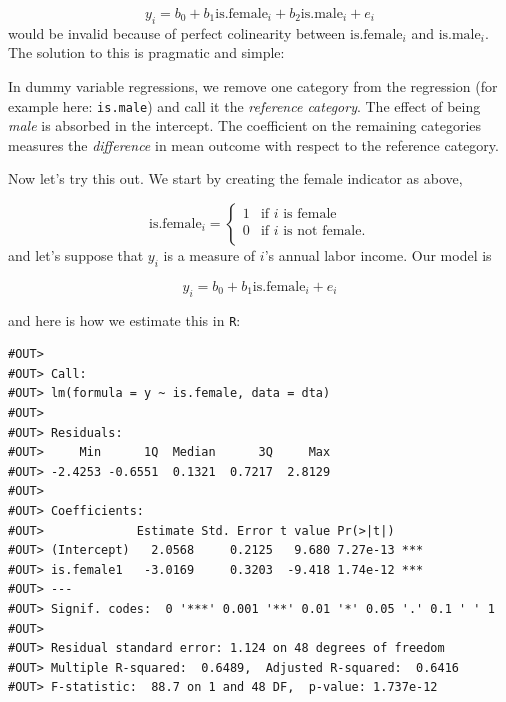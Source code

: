 \documentclass[]{book}
\newenvironment{Shaded}{\begin{snugshade}}{\end{snugshade}}
\newcommand{\CommentTok}[1]{\textcolor[rgb]{0.56,0.35,0.01}{\textit{#1}}}
\newcommand{\KeywordTok}[1]{\textcolor[rgb]{0.13,0.29,0.53}{\textbf{#1}}}
\newcommand{\NormalTok}[1]{#1}
\newcommand{\OperatorTok}[1]{\textcolor[rgb]{0.81,0.36,0.00}{\textbf{#1}}}
\newcommand{\StringTok}[1]{\textcolor[rgb]{0.31,0.60,0.02}{#1}}
\newenvironment{tip}{\begin{tcolorbox}[colback=green!5!white,colframe=green]}{\end{tcolorbox}}
\begin{document}
\[
y_i = b_0 + b_1 \text{is.female}_i + b_2 \text{is.male}_i + e_i
\]
would be invalid because of perfect colinearity between \(\text{is.female}_i\) and \(\text{is.male}_i\). The solution to this is pragmatic and simple:

\begin{tip}
In dummy variable regressions, we remove one category from the
regression (for example here: \texttt{is.male}) and call it the
\emph{reference category}. The effect of being \emph{male} is absorbed
in the intercept. The coefficient on the remaining categories measures
the \emph{difference} in mean outcome with respect to the reference
category.
\end{tip}

Now let's try this out. We start by creating the female indicator as above,

\[
\text{is.female}_i = \begin{cases}
          1 & \text{if }i\text{ is female} \\
            0 & \text{if }i\text{ is not female}. \\
   \end{cases}
\]
and let's suppose that \(y_i\) is a measure of \(i\)'s annual labor income. Our model is

\begin{equation}
y_i = b_0 + b_1 \text{is.female}_i + e_i \label{eq:dummy-reg}
\end{equation}

and here is how we estimate this in \texttt{R}:

\begin{Shaded}
\end{Shaded}

\begin{verbatim}
#OUT> 
#OUT> Call:
#OUT> lm(formula = y ~ is.female, data = dta)
#OUT> 
#OUT> Residuals:
#OUT>     Min      1Q  Median      3Q     Max 
#OUT> -2.4253 -0.6551  0.1321  0.7217  2.8129 
#OUT> 
#OUT> Coefficients:
#OUT>             Estimate Std. Error t value Pr(>|t|)    
#OUT> (Intercept)   2.0568     0.2125   9.680 7.27e-13 ***
#OUT> is.female1   -3.0169     0.3203  -9.418 1.74e-12 ***
#OUT> ---
#OUT> Signif. codes:  0 '***' 0.001 '**' 0.01 '*' 0.05 '.' 0.1 ' ' 1
#OUT> 
#OUT> Residual standard error: 1.124 on 48 degrees of freedom
#OUT> Multiple R-squared:  0.6489,	Adjusted R-squared:  0.6416 
#OUT> F-statistic:  88.7 on 1 and 48 DF,  p-value: 1.737e-12
\end{verbatim}
\end{document}
